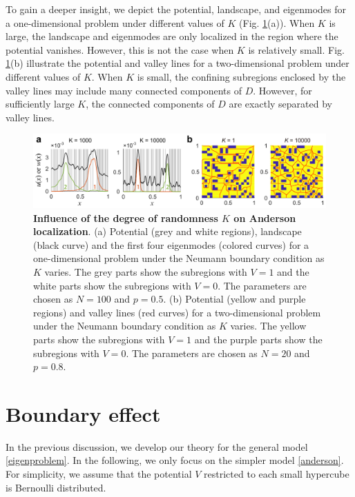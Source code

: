 \documentclass[a4paper,11pt]{article}
\begin{document}
To gain a deeper insight, we depict the potential, landscape, and eigenmodes for a one-dimensional problem under different values of $K$ (Fig. \ref{fig2}(a)). When $K$ is large, the landscape and eigenmodes are only localized in the region where the potential vanishes. However, this is not the case when $K$ is relatively small. Fig. \ref{fig2}(b) illustrate the potential and valley lines for a two-dimensional problem under different values of $K$. When $K$ is small, the confining subregions enclosed by the valley lines may include many connected components of $D$. However, for sufficiently large $K$, the connected components of $D$ are exactly separated by valley lines.
\begin{figure}
\centering
\includegraphics[width=\linewidth]{Fig2}
\caption{\textbf{Influence of the degree of randomness $K$ on Anderson localization}. (a) Potential (grey and white regions), landscape (black curve) and the first four eigenmodes (colored curves) for a one-dimensional problem under the Neumann boundary condition as $K$ varies. The grey parts show the subregions with $V=1$ and the white parts show the subregions with $V=0$. The parameters are chosen as $N=100$ and $p=0.5$. (b) Potential (yellow and purple regions) and valley lines (red curves) for a two-dimensional problem under the Neumann boundary condition as $K$ varies. The yellow parts show the subregions with $V = 1$ and the purple parts show the subregions with $V = 0$. The parameters are chosen as $N=20$ and $p=0.8$.}
\label{fig2}
\end{figure}


\section{Boundary effect}\label{boundary}
In the previous discussion, we develop our theory for the general model \eqref{eigenproblem}. In the following, we only focus on the simpler model \eqref{anderson}. For simplicity, we assume that the potential $V$ restricted to each small hypercube is Bernoulli distributed.
\end{document}
